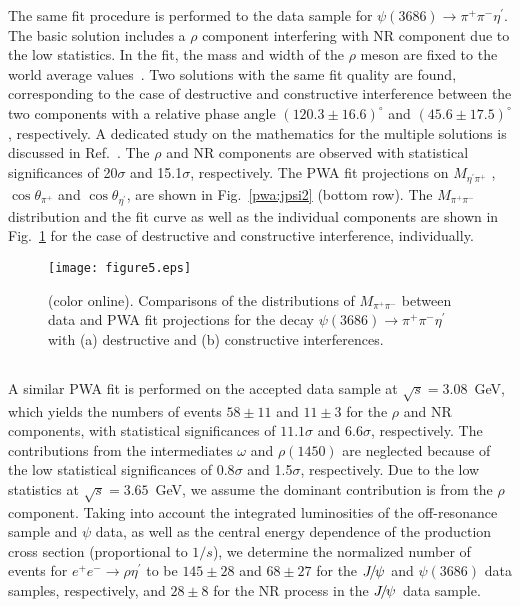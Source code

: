\documentclass[twocolumn,showpacs,aps,prd]{revtex4-1}
\newcommand{\etap}{\eta^{\prime}}
\newcommand{\psip}{\psi(3686)}
\newcommand{\psipphsp}{\psip\rightarrow\pi^{+} \pi^{-}\etap}
\begin{document}
The same fit procedure is performed to the data sample for $\psipphsp$. The basic solution includes a $\rho$ component interfering with NR component due to the low statistics. In the fit, the mass and width of the $\rho$ meson are fixed to the world average values~\cite{pdg}. Two solutions with the same fit quality are found, corresponding to the case of destructive and constructive interference between the two components with a relative phase angle $(120.3\pm16.6)^{\circ}$ and $(45.6\pm17.5)^{\circ}$, respectively. A dedicated study on the mathematics for the multiple solutions is discussed in Ref.~\cite{multisolution}. The $\rho$ and NR components are observed with statistical significances
of 20$\sigma$ and 15.1$\sigma$, respectively. The PWA fit projections on $M_{\etap\pi^+}$ , $\cos\theta_{\pi^+}$ and $\cos\theta_{\eta^\prime}$, are shown in Fig.~\ref{pwa:jpsi2} (bottom row). The $M_{\pi^{+}\pi^{-}}$ distribution and the fit curve as well as the individual components are shown in Fig.~\ref{pwa:psip} for the case of destructive and constructive interference, individually.


\begin{figure}[tb]
\centering
   \texttt{[image: figure5.eps]}
  \caption{(color online). Comparisons of the distributions of $M_{\pi^+\pi^-}$ between data and PWA fit projections for the decay $\psi(3686) \to
  \pi^+\pi^-\eta^\prime$ with (a) destructive and (b) constructive interferences.}
\label{pwa:psip}
\end{figure}


\subsection{}\label{pwaoffres}
 A similar PWA fit is performed on the accepted data sample at $\sqrt{s} = 3.08$~GeV, which yields the numbers of events $58\pm11$ and $11\pm3$ for the $\rho$ and NR components, with statistical significances of $11.1\sigma$ and $6.6\sigma$, respectively. The contributions from the intermediates $\omega$ and $\rho(1450)$ are neglected because of the low statistical significances of 0.8$\sigma$
  and 1.5$\sigma$, respectively. Due to the low statistics at $\sqrt s = 3.65$~GeV, we assume the dominant contribution is from the $\rho$ component. Taking into account the integrated luminosities of the off-resonance sample and $\psi$ data, as well as the central energy dependence of the production cross section (proportional to $1/s$), we determine the normalized number of events for $e^{+}e^{-}\to \rho\etap$ to be $145\pm28$ and $68\pm 27$ for the ${J\mskip -3mu/\mskip -2mu\psi\mskip 2mu}$ and $\psip$ data samples, respectively, and $28\pm8$ for the NR process in the ${J\mskip -3mu/\mskip -2mu\psi\mskip 2mu}$ data sample.
\end{document}
